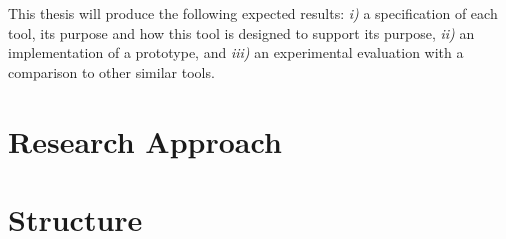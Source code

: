 This thesis will produce the following expected results: \textit{i)} a specification of each tool, its purpose and how this tool is designed to support its purpose, \textit{ii)} an implementation of a prototype, and \textit{iii)} an experimental evaluation with a comparison to other similar tools.

\section{Research Approach}

\section{Structure}
